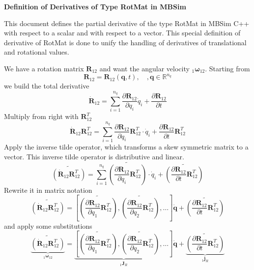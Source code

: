\documentclass{report}
\newcommand{\bs}[1]{\boldsymbol #1}
\begin{document}
\textbf{\Large{Definition of Derivatives of Type RotMat in MBSim}}
\vspace{3em}

This document defines the partial derivative of the type RotMat in MBSim C++ with respect to a scalar and with respect to a vector. This special definition of derivative of RotMat is done to unify the handling of derivatives of translational and rotational values.
\vspace{1em}

We have a rotation matrix $\bs{R}_{12}$ and want the angular velocity $_1\bs{\omega}_{12}$. Starting from
\begin{equation}
\bs{R}_{12}=\bs{R}_{12}(\bs{q},t),\quad,\bs{q}\in\mathbb{R}^{n_q}
\end{equation}
we build the total derivative
\begin{equation}
\dot{\bs{R}}_{12}=\sum_{i=1}^{n_q} \frac{\partial \bs{R}_{12}}{\partial q_i}\dot{q}_i + \frac{\partial \bs{R}_{12}}{\partial t}
\end{equation}
Multiply from right with $\bs{R}_{12}^T$
\begin{equation}
\dot{\bs{R}}_{12}\bs{R}_{12}^T=\sum_{i=1}^{n_q} \frac{\partial \bs{R}_{12}}{\partial q_i}\bs{R}_{12}^T\cdot\dot{q}_i + \frac{\partial \bs{R}_{12}}{\partial t}\bs{R}_{12}^T
\end{equation}
Apply the inverse tilde operator, which transforms a skew symmetric matrix to a vector. This inverse tilde operator is distributive and linear.
\begin{equation}
\widetilde{\left(\dot{\bs{R}}_{12}\bs{R}_{12}^T\right)}=\sum_{i=1}^{n_q} \widetilde{\left(\frac{\partial \bs{R}_{12}}{\partial q_i}\bs{R}_{12}^T\right)}\cdot\dot{q}_i + \widetilde{\left(\frac{\partial \bs{R}_{12}}{\partial t}\bs{R}_{12}^T\right)}
\end{equation}
Rewrite it in matrix notation
\begin{equation}
\widetilde{\left(\dot{\bs{R}}_{12}\bs{R}_{12}^T\right)}=\left[\widetilde{\left(\frac{\partial \bs{R}_{12}}{\partial q_1}\bs{R}_{12}^T\right)},\widetilde{\left(\frac{\partial \bs{R}_{12}}{\partial q_2}\bs{R}_{12}^T\right)},\dots\right]\dot{\bs{q}} + \widetilde{\left(\frac{\partial \bs{R}_{12}}{\partial t}\bs{R}_{12}^T\right)}
\end{equation}
and apply some substitutions
\begin{equation}
\underbrace{\widetilde{\left(\dot{\bs{R}}_{12}\bs{R}_{12}^T\right)}}_{_1\bs{\omega}_{12}}=\underbrace{\left[\widetilde{\left(\frac{\partial \bs{R}_{12}}{\partial q_1}\bs{R}_{12}^T\right)},\widetilde{\left(\frac{\partial \bs{R}_{12}}{\partial q_2}\bs{R}_{12}^T\right)},\dots\right]}_{_1\bs{J}_R}\dot{\bs{q}} + \underbrace{\widetilde{\left(\frac{\partial \bs{R}_{12}}{\partial t}\bs{R}_{12}^T\right)}}_{_1\bs{j}_R}
\end{equation}
\end{document}
